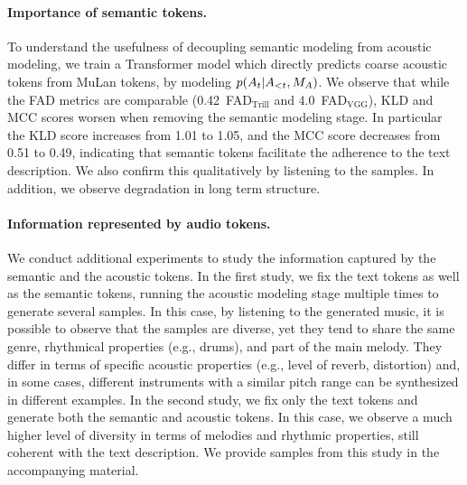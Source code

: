 \paragraph{Importance of semantic tokens.}
\label{results/semantic-tokens}
To understand the usefulness of decoupling semantic modeling from acoustic modeling, we train a Transformer model which directly predicts coarse acoustic tokens from MuLan tokens, by modeling $p(A_t\vert{A_{<t}},M_A)$.
We observe that while the FAD metrics are comparable (0.42~FAD$_{\text{Trill}}$ and 4.0~FAD$_{\text{VGG}}$), KLD and MCC scores worsen when removing the semantic modeling stage. In particular the KLD score increases from 1.01 to 1.05, and the MCC score decreases from 0.51 to 0.49, indicating that semantic tokens facilitate the adherence to the text description.
We also confirm this qualitatively by listening to the samples. In addition, we observe degradation in long term structure.

\paragraph{Information represented by audio tokens.}
\label{results/semantic-vs-acoustic}
We conduct additional experiments to study the information captured by the semantic and the acoustic tokens. In the first study, we fix the {\mulan} text tokens as well as the semantic tokens, running the acoustic modeling stage multiple times to generate several samples. In this case, by listening to the generated music, it is possible to observe that the samples are diverse, yet they tend to share the same genre, rhythmical properties (e.g., drums), and part of the main melody. They differ in terms of specific acoustic properties (e.g., level of reverb, distortion) and, in some cases, different instruments with a similar pitch range can be synthesized in different examples. In the second study, we fix only the {\mulan} text tokens and generate both the semantic and acoustic tokens. In this case, we observe a much higher level of diversity in terms of melodies and rhythmic properties, still coherent with the text description. We provide samples from this study in the accompanying material. 

